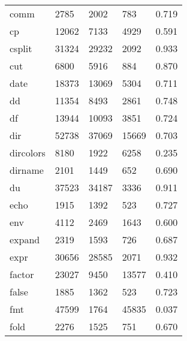 \begin{longtable}{lp{4.5cm}p{4.5cm}p{4.5cm}p{4.5cm}}
comm      &                     2785 &         2002 &           783 &                    0.719 \\
cp        &                    12062 &         7133 &          4929 &                    0.591 \\
csplit    &                    31324 &        29232 &          2092 &                    0.933 \\
cut       &                     6800 &         5916 &           884 &                    0.870 \\
date      &                    18373 &        13069 &          5304 &                    0.711 \\
dd        &                    11354 &         8493 &          2861 &                    0.748 \\
df        &                    13944 &        10093 &          3851 &                    0.724 \\
dir       &                    52738 &        37069 &         15669 &                    0.703 \\
dircolors &                     8180 &         1922 &          6258 &                    0.235 \\
dirname   &                     2101 &         1449 &           652 &                    0.690 \\
du        &                    37523 &        34187 &          3336 &                    0.911 \\
echo      &                     1915 &         1392 &           523 &                    0.727 \\
env       &                     4112 &         2469 &          1643 &                    0.600 \\
expand    &                     2319 &         1593 &           726 &                    0.687 \\
expr      &                    30656 &        28585 &          2071 &                    0.932 \\
factor    &                    23027 &         9450 &         13577 &                    0.410 \\
false     &                     1885 &         1362 &           523 &                    0.723 \\
fmt       &                    47599 &         1764 &         45835 &                    0.037 \\
fold      &                     2276 &         1525 &           751 &                    0.670 \\

\end{longtable}
